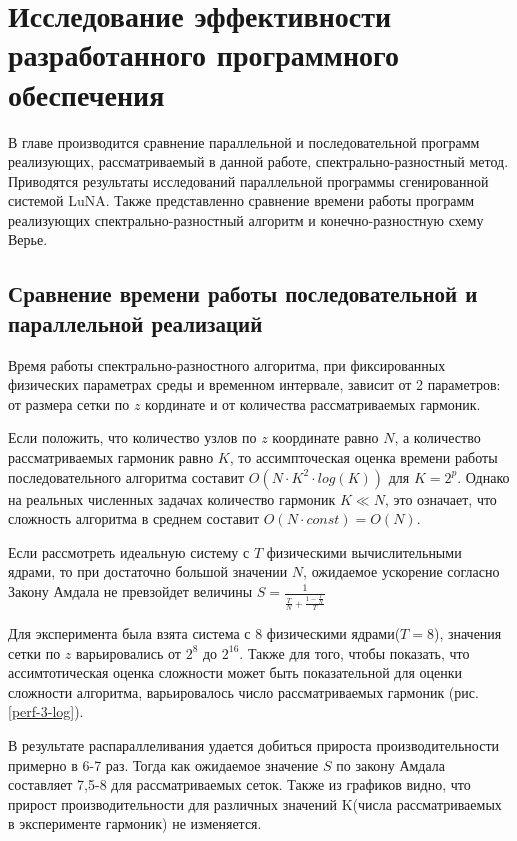 \section{Исследование эффективности разработанного программного обеспечения}

В главе производится сравнение параллельной и последовательной программ реализующих,
рассматриваемый в данной работе, спектрально-разностный метод.
Приводятся результаты исследований параллельной программы сгенированной системой LuNA.
Также представленно сравнение времени работы программ реализующих спектрально-разностный алгоритм
и конечно-разностную схему Верье.

\subsection{Сравнение времени работы последовательной и параллельной реализаций}

Время работы спектрально-разностного алгоритма, при фиксированных физических параметрах среды и временном интервале,
зависит от 2 параметров: от размера сетки по $z$ кординате и от количества рассматриваемых гармоник.

Если положить, что количество узлов по $z$ координате равно $N$, а количество рассматриваемых гармоник равно $K$,
то ассимпточеская оценка времени работы последовательного алгоритма составит $O(N\cdot K^2 \cdot log(K))$ для $K=2^p$. Однако на реальных численных задачах
количество гармоник $K \ll N$, это означает, что сложность алгоритма в среднем составит $O(N \cdot const)=O(N)$.

Если рассмотреть идеальную систему с $T$ физическими вычислительными ядрами, то при достаточно большой значении $N$,
ожидаемое ускорение согласно Закону Амдала не превзойдет величины $S = \frac{1}{\frac{T}{N} + \frac{1-\frac{T}{N}}{T}}$

Для эксперимента была взята система с 8 физическими ядрами($T=8$), значения сетки по $z$ варьировались от $2^8$ до $2^{16}$.
Также для того, чтобы показать, что ассимтотическая оценка сложности может быть показательной для оценки сложности алгоритма,
варьировалось число рассматриваемых гармоник (рис. \ref{perf-3-log}).


В результате распараллеливания удается добиться прироста производительности примерно в 6-7 раз. Тогда как
ожидаемое значение $S$ по закону Амдала составляет 7,5-8 для рассматриваемых сеток. Также из графиков видно, что прирост
производительности для различных значений K(числа рассматриваемых в эксперименте гармоник) не изменяется.

